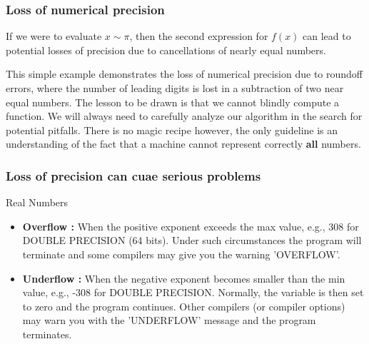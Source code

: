 \documentclass[compress]{beamer}
\begin{document}
\frame
{
  \frametitle{Loss of numerical precision}
\begin{small}
{\scriptsize
If we were to evaluate $x\sim \pi$, then the second expression for $f(x)$
can lead to potential losses of precision due to cancellations of nearly
equal numbers.

This simple example demonstrates  the loss of numerical precision due
to roundoff errors, where the number of leading digits is lost
in a subtraction of two near equal numbers.
The lesson to be drawn is that we cannot blindly compute a function.
We will always need to carefully analyze our algorithm in the search for
potential pitfalls. There is no magic recipe however, the only guideline
is an understanding of the fact that a machine cannot represent
correctly {\bf all} numbers.
}
\end{small}
}









\frame
{
  \frametitle{Loss of precision can cuae serious problems}
  \begin{block}{Real Numbers}
\begin{small}
{\scriptsize
\begin{itemize}
\item {\bf Overflow :} When the positive exponent exceeds the
max value, e.g., 308 for DOUBLE PRECISION (64 bits).
Under such circumstances the program will terminate and some
compilers may give you the warning 'OVERFLOW'.
\item {\bf Underflow :} When the negative exponent becomes smaller
than  the
min  value, e.g., -308 for DOUBLE PRECISION. Normally, the variable
is then set to zero and the program continues. Other compilers
(or compiler options) may warn you with the 'UNDERFLOW' message and
the program terminates.
\end{itemize}
}
\end{small}
  \end{block}
}


\end{document}
